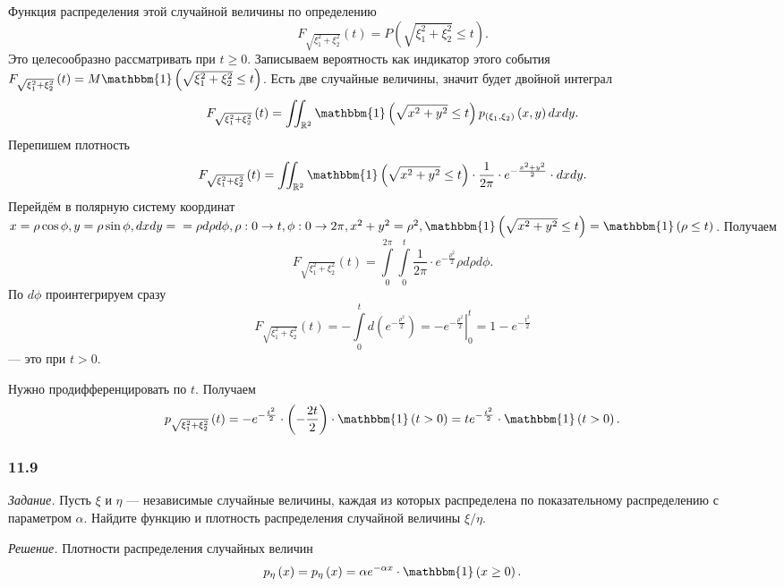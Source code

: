 Функция распределения этой случайной величины по определению
$$F_{ \sqrt{ \xi_1^2 + \xi_2^2}} \left( t \right) =
P \left( \sqrt{ \xi_1^2 + \xi_2^2} \leq t \right).$$
Это целесообразно рассматривать при $t \geq 0$.
Записываем вероятность как индикатор этого события $F_{ \sqrt{ \xi_1^2 + \xi_2^2}} \left( t \right) = M \mathbbm{1} \left( \sqrt{ \xi_1^2 + \xi_2^2} \leq t \right) $.
Есть две случайные величины, значит будет двойной интеграл
$$F_{ \sqrt{ \xi_1^2 + \xi_2^2}} \left( t \right) =
\iint_{ \mathbb{R}^2} \mathbbm{1} \left( \sqrt{x^2 + y^2} \leq t \right) p_{ \left( \xi_1, \xi_2 \right) } \left( x, y \right) dxdy.$$
Перепишем плотность
$$F_{ \sqrt{ \xi_1^2 + \xi_2^2}} \left( t \right) =
\iint_{ \mathbb{R}^2} \mathbbm{1} \left( \sqrt{x^2 + y^2} \leq t \right) \cdot \frac{1}{2 \pi } \cdot e^{- \frac{x^2 + y^2}{2}} \cdot dxdy.$$
Перейдём в полярную систему координат
$x = \rho \cos \phi,
y = \rho \sin \phi,
dxdy = \\
= \rho d \rho d \phi,
\rho: 0 \rightarrow t,
\phi: 0 \rightarrow 2 \pi,
x^2 + y^2 = \rho^2,
\mathbbm{1} \left( \sqrt{x^2 + y^2} \leq t \right) = \mathbbm{1} \left( \rho \leq t \right) $.
Получаем
$$F_{ \sqrt{ \xi_1^2 + \xi_2^2}} \left( t \right) =
\int \limits_0^{2 \pi } \int \limits_0^t \frac{1}{2 \pi } \cdot e^{- \frac{ \rho^2}{2}} \rho d \rho d \phi.$$
По $d \phi $ проинтегрируем сразу
$$F_{ \sqrt{ \xi_1^2 + \xi_2^2}} \left( t \right) =
- \int \limits_0^t d \left( e^{- \frac{ \rho^2}{2}} \right) =
\left. - e^{- \frac{ \rho^2}{2}} \right|_0^t =
1 - e^{- \frac{t^2}{2}}$$
--- это при $t > 0$.

Нужно продифференцировать по $t$.
Получаем
$$p_{ \sqrt{ \xi_1^2 + \xi_2^2}} \left( t \right) =
- e^{- \frac{t^2}{2}} \cdot \left( - \frac{2t}{2} \right) \cdot \mathbbm{1} \left( t > 0 \right) =
te^{- \frac{t^2}{2}} \cdot \mathbbm{1} \left( t > 0 \right).$$

\subsubsection*{11.9}

\textit{Задание.} Пусть $ \xi $ и $ \eta $ --- независимые случайные величины, каждая из которых распределена по показательному распределению с параметром $ \alpha $.
Найдите функцию и плотность распределения случайной величины $ \xi/\eta $.

\textit{Решение.}
Плотности распределения случайных величин
$$p_{ \eta } \left( x \right) =
p_{ \eta } \left( x \right) =
\alpha e^{- \alpha x} \cdot \mathbbm{1} \left( x \geq 0 \right).$$

